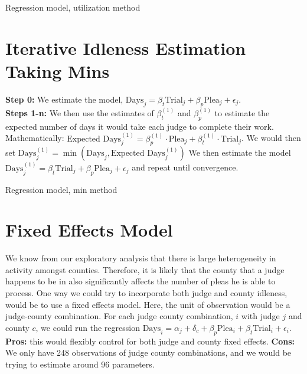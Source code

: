 \documentclass[11pt]{article}
\begin{document}
  \begin{table}[H]
    \centering
    \caption{Regression model, utilization method}
    
  \end{table}

\section{Iterative Idleness Estimation Taking Mins}
  \textbf{Step 0:} We estimate the model, $\text{Days}_j = \beta_t\text{Trial}_j + \beta_p\text{Plea}_j +\epsilon_j$. \\

  \noindent \textbf{Steps 1-n:} We then use the estimates of $\beta^{(1)}_t$ and $\beta^{(1)}_p$ to estimate the expected number
  of days it would take each judge to complete their work. Mathematically: $\text{Expected Days}^{(1)}_j = \beta^{(1)}_p \cdot \text{Plea}_j + \beta^{(1)}_t \cdot \text{Trial}_j$.
  We would then set $\text{Days}^{(1)}_j = \min(\text{Days}_j,\text{Expected Days}^{(1)}_j)$ We then estimate the model $\text{Days}^{(1)}_j = \beta_t\text{Trial}_j + \beta_p\text{Plea}_j +\epsilon_j$ and repeat until convergence.

      \begin{table}[H]
        \centering
        \caption{Regression model, min method}
        
      \end{table}

\section{Fixed Effects Model}
  We know from our exploratory analysis that there is large heterogeneity in activity amongst counties. Therefore, it is likely that the county that a judge happens to be in also significantly affects the number of pleas he is able to process. One way we could try to incorporate both judge and county idleness, would be to use
  a fixed effects model.  Here, the unit of observation would be a judge-county combination. For each judge county combination, $i$ with judge $j$ and county $c$, we could run the regression $\text{Days}_i = \alpha_j + \delta_c + \beta_p \text{Plea}_i + \beta_t \text{Trial}_i + \epsilon_i$. \textbf{Pros:} this would flexibly control for both judge and county fixed effects. \textbf{Cons:} We only have 248 observations of judge county combinations, and we would be trying to estimate around 96 parameters.
\end{document}

